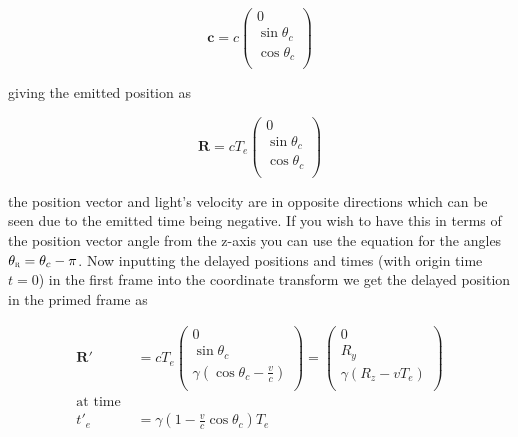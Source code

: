 \begin{equation}
	\mathbf{c} = {c}
	\begin{pmatrix}
		0              \\
		\sin{\theta_c} \\
		\cos{\theta_c} \\
	\end{pmatrix}
\end{equation}

giving the emitted position as

\begin{equation}
	\mathbf{R} ={c}{{T}_{e}}
	\begin{pmatrix}
		0              \\
		\sin{\theta_c} \\
		\cos{\theta_c} \\
	\end{pmatrix}
\end{equation}

the position vector and light's velocity are in opposite directions which can be seen due to the emitted time being negative.
If you wish to have this in terms of the position vector angle from the z-axis you can use the equation for the angles ${\theta_{\scalebox{0.5}{R}}} = {\theta_c}-{\pi}$.
Now inputting the delayed positions and times (with origin time ${t} = 0$) in the first frame into the coordinate transform we get the delayed position in the primed frame as

\begin{equation}
	\begin{aligned}
		\mathbf{R}{'}   & = {c}{T}_{e}
		\begin{pmatrix}
			0                                                  \\
			\sin{\theta_c}                                     \\
			{\gamma} \left( \cos{\theta_c}-\frac{v}{c} \right) \\
		\end{pmatrix}
		=
		\begin{pmatrix}
			0                                               \\
			{{R}_{y}}                                       \\
			{\gamma} \left( {{R}_{z}}-{v} {{T}_{e}} \right) \\
		\end{pmatrix}
		\\
		\text{at time } &
		\\ {{t}{'}_{e}} & = {\gamma} (1-\frac{v}{c} \cos{\theta_{c}} ) {{T}_{e}}
	\end{aligned}
\end{equation}

